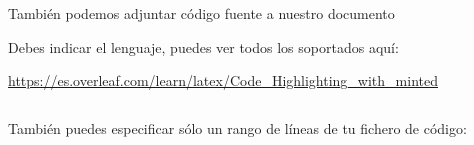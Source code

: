 También podemos adjuntar código fuente a nuestro documento

Debes indicar el lenguaje, puedes ver todos los soportados aquí:

\url{https://es.overleaf.com/learn/latex/Code_Highlighting_with_minted}

\inputminted{c}{secciones/desarrollo/ejemplo.c}

También puedes especificar sólo un rango de líneas de tu fichero de código:

\inputminted[firstline=4,lastline=5]{c}{secciones/desarrollo/ejemplo.c}
